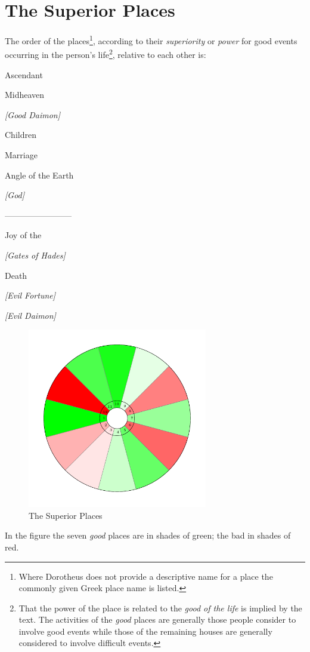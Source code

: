 \section{The Superior Places}
\label{sec:superior-places}
The order of the places\footnote{Where Dorotheus does not provide a descriptive name for a place the commonly given Greek place name is listed.}, according to their \textsl{superiority} or \textsl{power} for good events occurring in the person's life\footnote{That the power of the place is related to the \textsl{good of the life} is implied by the text. The activities of the \textsl{good} places are generally those people consider to involve good events while those of the remaining houses are generally considered to involve difficult events.}, relative to each other is:

\begin{description}[labelindent=0em, labelwidth=4em, labelsep=0.5em, leftmargin =!, align=right, itemsep=0em]
\item[1st] Ascendant
\item[10th] Midheaven
\item[11th] \textsl{[Good Daimon]}
\item[5th] Children
\item[7th] Marriage
\item[4th] Angle of the Earth
\item[9th] \textsl{[God]}
\item[] ------------------------
\item[3rd] Joy of the \Moon
\item[2nd] \textsl{[Gates of Hades]}
\item[8th] Death
\item[6th] \textsl{[Evil Fortune]}
\item[12th] \textsl{[Evil Daimon]}
\end{description}
\vspace{-2em}
\begin{figure}[H]
\centering
\includegraphics[width=0.7\textwidth]{diagrams/superior-places}
\vspace{-1em}
\caption{The Superior Places}
\end{figure}
\begin{mdframed}[backgroundcolor=cyan!5, rightmargin=1em, leftmargin=1em]
\small
In the figure the seven \textsl{good} places are in shades of green; the bad in shades of red.
\end{mdframed}
